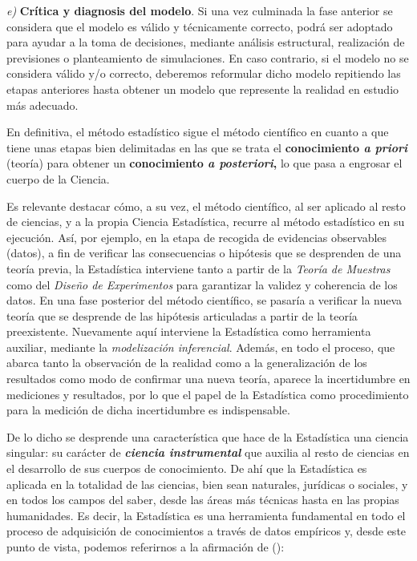 \documentclass[
]{book}
\begin{document}
\emph{e)} \textbf{Crítica y diagnosis del modelo}. Si una vez culminada la fase anterior se considera que el modelo es válido y técnicamente correcto, podrá ser adoptado para ayudar a la toma de decisiones, mediante análisis estructural, realización de previsiones o planteamiento de simulaciones. En caso contrario, si el modelo no se considera válido y/o correcto, deberemos reformular dicho modelo repitiendo las etapas anteriores hasta obtener un modelo que represente la realidad en estudio más adecuado.

En definitiva, el método estadístico sigue el método científico en cuanto a que tiene unas etapas bien delimitadas en las que se trata el \textbf{conocimiento \emph{a priori}} (teoría) para obtener un \textbf{conocimiento \emph{a posteriori},} lo que pasa a engrosar el cuerpo de la Ciencia.

Es relevante destacar cómo, a su vez, el método científico, al ser aplicado al resto de ciencias, y a la propia Ciencia Estadística, recurre al método estadístico en su ejecución. Así, por ejemplo, en la etapa de recogida de evidencias observables (datos), a fin de verificar las consecuencias o hipótesis que se desprenden de una teoría previa, la Estadística interviene tanto a partir de la \emph{Teoría de Muestras} como del \emph{Diseño de Experimentos} para garantizar la validez y coherencia de los datos. En una fase posterior del método científico, se pasaría a verificar la nueva teoría que se desprende de las hipótesis articuladas a partir de la teoría preexistente. Nuevamente aquí interviene la Estadística como herramienta auxiliar, mediante la \emph{modelización inferencial}. Además, en todo el proceso, que abarca tanto la observación de la realidad como a la generalización de los resultados como modo de confirmar una nueva teoría, aparece la incertidumbre en mediciones y resultados, por lo que el papel de la Estadística como procedimiento para la medición de dicha incertidumbre es indispensable.

De lo dicho se desprende una característica que hace de la Estadística una ciencia singular: su carácter de \textbf{\emph{ciencia instrumental}} que auxilia al resto de ciencias en el desarrollo de sus cuerpos de conocimiento. De ahí que la Estadística es aplicada en la totalidad de las ciencias, bien sean naturales, jurídicas o sociales, y en todos los campos del saber, desde las áreas más técnicas hasta en las propias humanidades. Es decir, la Estadística es una herramienta fundamental en todo el proceso de adquisición de conocimientos a través de datos empíricos y, desde este punto de vista, podemos referirnos a la afirmación de ():
\end{document}
